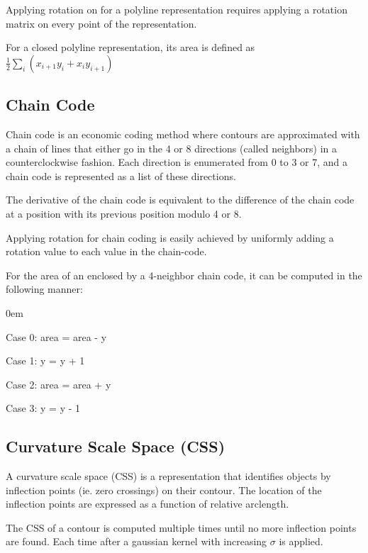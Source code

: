 \documentclass{article}
\begin{document}
\begin{multicols}{3}
Applying rotation on for a polyline representation requires applying a rotation matrix on every point of the representation.

For a closed polyline representation, its area is defined as $\frac{1}{2}\sum_{i}(x_{i+1}y_i + x_iy_{i+1})$

\subsection{Chain Code}

Chain code is an economic coding method where contours are approximated with a chain of lines that either go in the 4 or 8 directions (called neighbors) in a counterclockwise fashion. Each direction is enumerated from 0 to 3 or 7, and a chain code is represented as a list of these directions.

The derivative of the chain code is equivalent to the difference of the chain code at a position with its previous position modulo 4 or 8.

Applying rotation for chain coding is easily achieved by uniformly adding a rotation value to each value in the chain-code.

For the area of an enclosed by a 4-neighbor chain code, it can be computed in the following manner:

\begin{itemize}
  \itemsep0em
  \begin{multicols}{2}
  \item Case 0: area = area - y
  \item Case 1: y = y + 1
  \item Case 2: area = area + y
  \item Case 3: y = y - 1
  \end{multicols}
\end{itemize}

\subsection{Curvature Scale Space (CSS)}

A curvature scale space (CSS) is a representation that identifies objects by inflection points (ie. zero crossings) on their contour. The location of the inflection points are expressed as a function of relative arclength. 

The CSS of a contour is computed multiple times until no more inflection points are found. Each time after a gaussian kernel with increasing $\sigma$ is applied.


\end{multicols}
\end{document}
